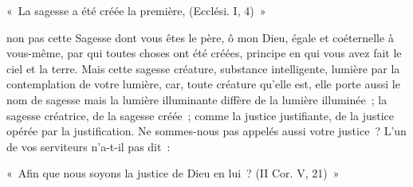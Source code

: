 \documentclass[french,twoside]{book} %
\newenvironment{quoteblock}%
  {\begin{quoting}}
  {\end{quoting}}
\newenvironment{quotebar}{%
    \def\FrameCommand{{\color{rubric!10!}\vrule width 0.5em} \hspace{0.9em}}%
    \def\OuterFrameSep{\itemsep} %
    \MakeFramed {\advance\hsize-\width \FrameRestore}
  }%
  {%
    \endMakeFramed
  }
\renewenvironment{quoteblock}%
  {%
    \savenotes
    \setstretch{0.9}
    \normalfont
    \begin{quotebar}
  }
  {%
    \end{quotebar}
    \spewnotes
  }
\begin{document}
\begin{quoteblock}
\noindent « La sagesse a été créée la première, (Ecclési. I, 4) »\end{quoteblock}

\noindent non pas cette Sagesse dont vous êtes le père, ô mon Dieu, égale et coéternelle à vous-même, par qui toutes choses ont été créées, principe en qui vous avez fait le ciel et la terre. Mais cette sagesse créature, substance intelligente, lumière par la contemplation de votre lumière, car, toute créature qu’elle est, elle porte aussi le nom de sagesse mais la lumière illuminante diffère de la lumière illuminée ; la sagesse créatrice, de la sagesse créée ; comme la justice justifiante, de la justice opérée par la justification. Ne sommes-nous pas appelés aussi votre justice ? L’un de vos serviteurs n’a-t-il pas dit :\par

\begin{quoteblock}
\noindent « Afin que nous soyons la justice de Dieu en lui ? (II Cor. V, 21) »\end{quoteblock}
\end{document}

